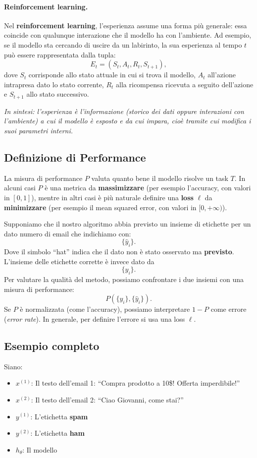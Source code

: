 \paragraph{Reinforcement learning.}
Nel \textbf{reinforcement learning}, l'esperienza assume una forma pi\`u generale: essa coincide con qualunque interazione che il modello ha con l'ambiente. Ad esempio, se il modello sta cercando di uscire da un labirinto, la sua esperienza al tempo $t$ pu\`o essere rappresentata dalla tupla:
\[
E_t = (S_t, A_t, R_t, S_{t+1}),
\]
dove $S_t$ corrisponde allo stato attuale in cui si trova il modello, $A_t$ all'azione intrapresa dato lo stato corrente, $R_t$ alla ricompensa ricevuta a seguito dell'azione e $S_{t+1}$ allo stato successivo.

\medskip
\noindent
\textit{In sintesi: l'esperienza \`e l'informazione (storico dei dati oppure interazioni con l'ambiente) a cui il modello \`e esposto e da cui impara, cio\`e tramite cui modifica i suoi parametri interni.}

\subsection{Definizione di Performance}

La misura di performance $P$ valuta quanto bene il modello risolve un task $T$. In alcuni casi $P$ \`e una metrica da \textbf{massimizzare} (per esempio l'accuracy, con valori in $[0,1]$), mentre in altri casi \`e pi\`u naturale definire una \textbf{loss} $\ell$ da \textbf{minimizzare} (per esempio il mean squared error, con valori in $[0,+\infty)$).

Supponiamo che il nostro algoritmo abbia previsto un insieme di etichette per un dato numero di email che indichiamo con:
\[
\{\hat{y}_i\}.
\]
\noindent
Dove il simbolo ``hat'' indica che il dato non \`e stato osservato ma \textbf{previsto}. L'insieme delle etichette corrette \`e invece dato da
\[
\{y_i\}.
\]
\noindent
Per valutare la qualit\`a del metodo, possiamo confrontare i due insiemi con una misura di performance:
\[
P(\{y_i\}, \{\hat{y}_i\}).
\]
\noindent
Se $P$ \`e normalizzata (come l'accuracy), possiamo interpretare $1-P$ come errore (\emph{error rate}). In generale, per definire l'errore si usa una loss $\ell$.

\subsection{Esempio completo}

Siano:
\begin{itemize}
\item $x^{(1)}$: Il testo dell'email 1: ``Compra prodotto a 10\$! Offerta imperdibile!''
\item $x^{(2)}$: Il testo dell'email 2: ``Ciao Giovanni, come stai?''
\item $y^{(1)}$: L'etichetta \textbf{spam}
\item $y^{(2)}$: L'etichetta \textbf{ham}
\item $h_\theta$: Il modello
\end{itemize}

